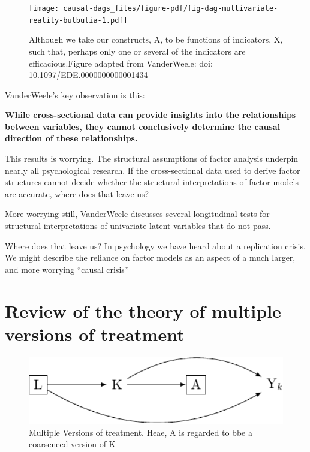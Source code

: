 \documentclass[
  singlecolumn]{report}
\begin{document}
\begin{figure}

{\centering \texttt{[image: causal-dags\_files/figure-pdf/fig-dag-multivariate-reality-bulbulia-1.pdf]}

}

\caption{\label{fig-dag-multivariate-reality-bulbulia}Although we take
our constructs, A, to be functions of indicators, X, such that, perhaps
only one or several of the indicators are efficacious.Figure adapted
from VanderWeele: doi: 10.1097/EDE.0000000000001434}

\end{figure}

VanderWeele's key observation is this:

\textbf{While cross-sectional data can provide insights into the
relationships between variables, they cannot conclusively determine the
causal direction of these relationships.}

This results is worrying. The structural assumptions of factor analysis
underpin nearly all psychological research. If the cross-sectional data
used to derive factor structures cannot decide whether the structural
interpretations of factor models are accurate, where does that leave us?

More worrying still, VanderWeele discusses several longitudinal tests
for structural interpretations of univariate latent variables that do
not pass.

Where does that leave us? In psychology we have heard about a
replication crisis. We might describe the reliance on factor models as
an aspect of a much larger, and more worrying ``causal crisis''

\hypertarget{review-of-the-theory-of-multiple-versions-of-treatment}{%
\section{Review of the theory of multiple versions of
treatment}\label{review-of-the-theory-of-multiple-versions-of-treatment}}

\begin{figure}

{\centering \includegraphics[width=1\textwidth,height=\textheight]{causal-dags_files/figure-pdf/fig_dag_multiple_version_treatment_dag-1.pdf}

}

\caption{Multiple Versions of treatment. Heae, A is regarded to bbe a
coarseneed version of K}

\end{figure}
\end{document}
